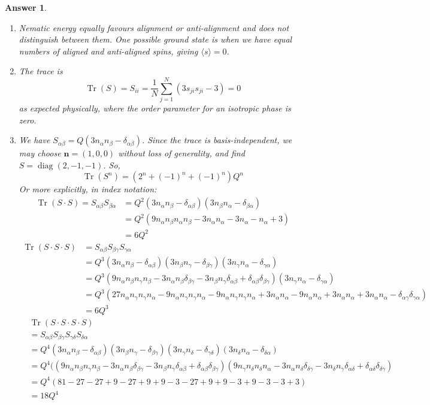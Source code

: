 \documentclass[a4paper]{article}
\DeclareMathOperator{\Tr}{Tr}
\DeclareMathOperator{\diag}{diag}
\newtheorem{ans}{Answer}[section]
\theoremstyle{new}
\begin{document}
\begin{ans}\leavevmode
\begin{enumerate}[label=(\alph*)]
\item Nematic energy equally favours alignment or anti-alignment and does not distinguish between them. One possible ground state is when we have equal numbers of aligned and anti-aligned spins, giving $\langle s\rangle=0$.
\item The trace is
$$\Tr(S)=S_{ii}=\frac{1}{N}\sum_{j=1}^N(3s_{ji}s_{ji}-3)=0$$
as expected physically, where the order parameter for an isotropic phase is zero.
\item We have $S_{\alpha\beta}=Q(3n_\alpha n_\beta-\delta_{\alpha\beta})$. Since the trace is basis-independent, we may choose $\mathbf{n}=(1,0,0)$ without loss of generality, and find $S=\diag(2,-1,-1)$. So,
$$\Tr(S^n)=(2^n+(-1)^n+(-1)^n)Q^n$$
Or more explicitly, in index notation:
\begin{align}
    \Tr(S\cdot S)=S_{\alpha\beta}S_{\beta\alpha}&=Q^2(3n_\alpha n_\beta-\delta_{\alpha\beta})(3n_\beta n_\alpha-\delta_{\beta\alpha})\nonumber\\&=Q^2(9n_\alpha n_\beta n_\alpha n_\beta-3n_\alpha n_\alpha-3n_\alpha-n_\alpha+3)\nonumber\\&=6Q^2\nonumber
\end{align}
\begin{align}
    \Tr(S\cdot S\cdot S)&=S_{\alpha\beta}S_{\beta\gamma}S_{\gamma\alpha}\nonumber\\&=Q^3(3n_\alpha n_\beta-\delta_{\alpha\beta})(3n_\beta n_\gamma-\delta_{\beta\gamma})(3n_\gamma n_\alpha-\delta_{\gamma\alpha})\nonumber\\&=Q^3(9n_\alpha n_\beta n_\gamma n_\beta-3n_\alpha n_\beta\delta_{\beta\gamma}-3n_\beta n_\gamma\delta_{\alpha\beta}+\delta_{\alpha\beta}\delta_{\beta\gamma})(3n_\gamma n_\alpha-\delta_{\gamma\alpha})\nonumber\\&=Q^3(27 n_\alpha n_\gamma n_\gamma n_\alpha-9n_\alpha n_\gamma n_\gamma n_\alpha-9n_\alpha n_\gamma n_\gamma n_\alpha+3n_\alpha n_\alpha -9n_\alpha n_\alpha+3n_\alpha n_\alpha+3n_\alpha n_\alpha-\delta_{\alpha\gamma}\delta_{\gamma\alpha})\nonumber\\&=6Q^3\nonumber
\end{align}
\begin{align}
    &\Tr(S\cdot S\cdot S\cdot S)\nonumber\\&=S_{\alpha\beta}S_{\beta\gamma}S_{\gamma\delta}S_{\delta\alpha}\nonumber\\&=Q^4(3n_\alpha n_\beta-\delta_{\alpha\beta})(3n_\beta n_\gamma-\delta_{\beta\gamma})(3n_\gamma n_\delta-\delta_{\gamma\delta})(3n_\delta n_\alpha-\delta_{\delta\alpha})\nonumber\\&=Q^4((9n_\alpha n_\beta n_\gamma n_\beta-3n_\alpha n_\beta\delta_{\beta\gamma}-3n_\beta n_\gamma\delta_{\alpha\beta}+\delta_{\alpha\beta}\delta_{\beta\gamma})(9n_\gamma n_\delta n_\delta n_\alpha-3n_\alpha n_\delta\delta_{\delta\gamma}-3n_\delta n_\gamma\delta_{\alpha\delta}+\delta_{\alpha\delta}\delta_{\delta\gamma})\nonumber\\&=Q^4(81-27-27+9-27+9+9-3-27+9+9-3+9-3-3+3)\nonumber\\&=18Q^4\nonumber

\end{align}
\end{enumerate}
\end{ans}
\end{document}
